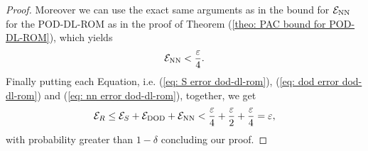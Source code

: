 \begin{proof}

    Moreover we can use the exact same arguments as in the bound for $\mathcal{E}_{\text{NN}}$ for the POD-DL-ROM as in the
    proof of Theorem (\ref{theo: PAC bound for POD-DL-ROM}), which yields
    \begin{equation} \label{eq: nn error dod-dl-rom}
        \mathcal{E}_{\text{NN}} < \frac{\varepsilon}{4}.
    \end{equation}
    Finally putting each Equation, i.e. (\ref{eq: S error dod-dl-rom}), (\ref{eq: dod error dod-dl-rom}) and (\ref{eq: nn error dod-dl-rom}),
    together, we get 
    \begin{equation*}
        \mathcal{E}_R \leq \mathcal{E}_S + \mathcal{E}_{\text{DOD}} + \mathcal{E}_{\text{NN}} < \frac{\varepsilon}{4} +  \frac{\varepsilon}{2}
        + \frac{\varepsilon}{4} = \varepsilon,
    \end{equation*}
    with probability greater than $1 - \delta$ concluding our proof.
\end{proof}
